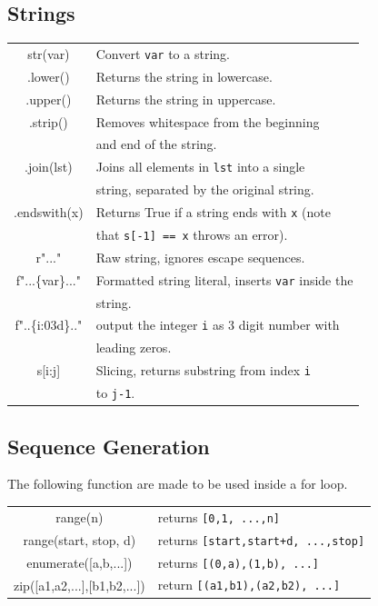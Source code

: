 \documentclass[5pt]{article}
\begin{document}
\begin{multicols}{2}
\subsection{Strings}
\begin{tabular}{C L}
    str(var)        & Convert \texttt{var} to a string.\\
    .lower()        & Returns the string in lowercase.\\
    .upper()        & Returns the string in uppercase.\\
    .strip()        & Removes whitespace from the beginning\\
                    & and end of the string.\\
    .join(lst)      & Joins all elements in \texttt{lst} into a single\\
                    & string, separated by the original string.\\
    .endswith(x)    & Returns True if a string ends with \texttt{x} (note\\
                    & that \texttt{s[-1] == x} throws an error).\\
    r"..."          & Raw string, ignores escape sequences.\\
    f"...\{var\}..."& Formatted string literal, inserts \texttt{var} inside the\\
                    & string.\\
    f"..\{i:03d\}.."& output the integer \texttt{i} as 3 digit number with\\
                    & leading zeros.\\
    s[i:j]          & Slicing, returns substring from index \texttt{i}\\
                    & to \texttt{j-1}.\\
\end{tabular}

\subsection{Sequence Generation}
The following function are made to be used inside a for loop.
\begin{tabular}{C L}
    range(n)                    & returns \texttt{[0,1, ...,n]}\\
    range(start, stop, d)       & returns \texttt{[start,start+d, ...,stop]}\\
    enumerate([a,b,...])        & returns \texttt{[(0,a),(1,b), ...]}\\
    zip([a1,a2,...],[b1,b2,...])& return \texttt{[(a1,b1),(a2,b2), ...]}\\
\end{tabular}


\end{multicols}
\end{document}
